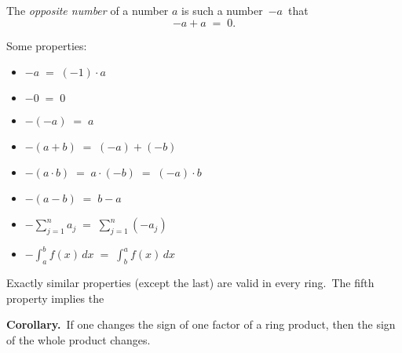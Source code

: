 \documentclass[12pt]{article}
\begin{document}
The {\em opposite number} of a number $a$ is such a number\, $-a$\, that
              $$-a\!+\!a \;=\; 0.$$

Some properties:
\begin{itemize}
 \item $-a \;=\; (-1)\!\cdot\!a$
 \item $-0 \;=\; 0$
 \item $-(-a) \;=\; a$
 \item $-(a\!+\!b) \;=\; (-a)\!+\!(-b)$
 \item $-(a\!\cdot\!b) \;=\; a\!\cdot\!(-b) \;=\; (-a)\!\cdot\!b$
 \item $-(a\!-\!b) \;=\; b\!-\!a$
 \item $-\sum_{j = 1}^n a_j \;=\; \sum_{j = 1}^n (-a_j)$
 \item $-\int_a^b f(x)\,dx \;=\; \int_b^a f(x)\,dx$
\end{itemize}
Exactly similar properties (except the last) are valid in every ring.\, The fifth property implies the

\textbf{Corollary.}\, If one changes the sign of one factor of a ring product, then the sign of the whole product changes.

\end{document}
